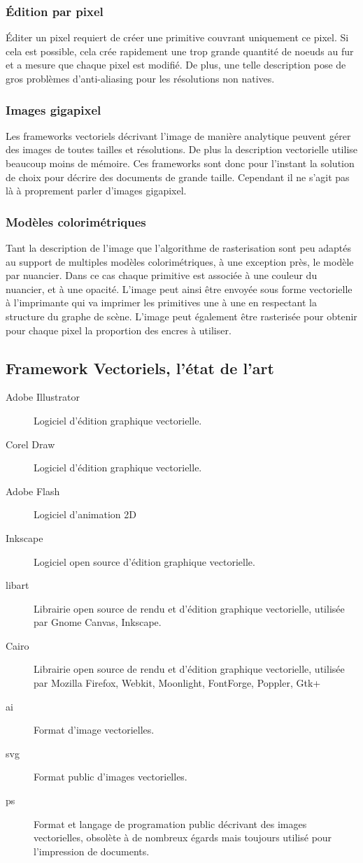 			\subsubsection{Édition par pixel}
				Éditer un pixel requiert de créer une primitive couvrant uniquement ce pixel. Si cela est possible, cela crée rapidement une trop
				grande quantité de noeuds au fur et a mesure que chaque pixel est modifié. De plus, une telle description pose de gros problèmes
				d'anti-aliasing pour les résolutions non natives. 
			\subsubsection{Images gigapixel}
				Les frameworks vectoriels décrivant l'image de manière analytique peuvent gérer des images de toutes tailles et résolutions. De 
				plus la description vectorielle utilise beaucoup moins de mémoire. Ces frameworks sont donc pour l'instant la solution de choix
				pour décrire des documents de grande taille. Cependant il ne s'agit pas là à proprement parler d'images gigapixel.  
			\subsubsection{Modèles colorimétriques}
				Tant la description de l'image que l'algorithme de rasterisation sont peu adaptés au support de multiples modèles 
				colorimétriques, à une exception près, le modèle par nuancier. Dans ce cas chaque primitive est associée à une couleur du nuancier,
				et à une opacité. L'image peut ainsi être envoyée sous forme vectorielle à l'imprimante qui va imprimer les primitives une à une
				en respectant la structure du graphe de scène. L'image peut également être rasterisée pour obtenir pour chaque pixel la proportion
				des encres à utiliser. 
		\subsection{Framework Vectoriels, l'état de l'art}
			\begin{description}
				\item[Adobe Illustrator]Logiciel d'édition graphique vectorielle. 
				\item[Corel Draw]Logiciel d'édition graphique vectorielle.
				\item[Adobe Flash]Logiciel d'animation 2D
				\item[Inkscape]Logiciel open source d'édition graphique vectorielle.
				\item[libart]Librairie open source de rendu et d'édition graphique vectorielle, utilisée par Gnome Canvas, Inkscape.
				\item[Cairo]Librairie open source de rendu et d'édition graphique vectorielle, utilisée par Mozilla Firefox, Webkit, Moonlight,
				FontForge, Poppler, Gtk+
				\item[ai]Format d'image vectorielles.
				\item[svg]Format public d'images vectorielles.
				\item[ps]Format et langage de programation public décrivant des images vectorielles, obsolète à de nombreux égards mais toujours utilisé pour l'impression de documents.  
			\end{description}

